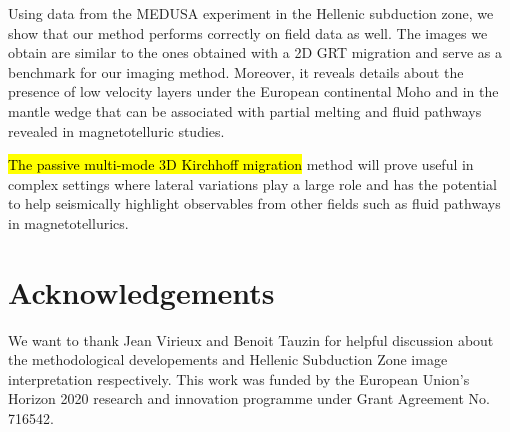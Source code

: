 \documentclass[10pt,a4paper]{article}
\begin{document}
Using data from the MEDUSA experiment in the Hellenic subduction zone, we show that our method performs correctly on field data as well.
The images we obtain are similar to the ones obtained with a 2D GRT migration and serve as a benchmark for our imaging method.
Moreover, it reveals details about the presence of low velocity layers under the European continental Moho and in the mantle wedge that can be associated with partial melting and fluid pathways revealed in magnetotelluric studies.

\hl{The passive multi-mode 3D Kirchhoff migration} method will prove useful in complex settings where lateral variations play a large role and has the potential to help seismically highlight observables from other fields such as fluid pathways in magnetotellurics.

\section*{Acknowledgements}

We want to thank Jean Virieux and Benoit Tauzin for helpful discussion about the methodological developements and Hellenic Subduction Zone image interpretation respectively.
This work was funded by the European Union’s Horizon 2020 research and innovation programme under Grant Agreement No. 716542.


%




\end{document}
